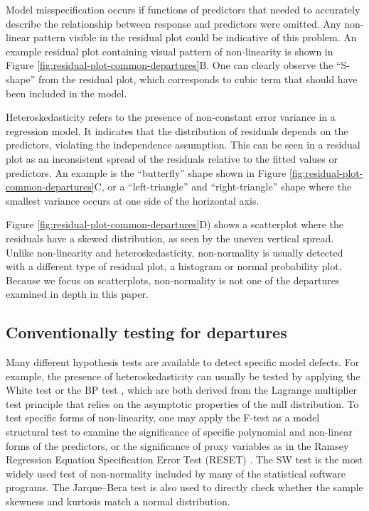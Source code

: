 \documentclass[]{interact}
\theoremstyle{plain}%
\theoremstyle{definition}
\theoremstyle{remark}
\begin{document}
Model misspecification occurs if functions of predictors that needed to
accurately describe the relationship between response and predictors
were omitted. Any non-linear pattern visible in the residual plot could
be indicative of this problem. An example residual plot containing
visual pattern of non-linearity is shown in Figure
\ref{fig:residual-plot-common-departures}B. One can clearly observe the
``S-shape'' from the residual plot, which corresponds to cubic term that
should have been included in the model.

Heteroskedasticity refers to the presence of non-constant error variance
in a regression model. It indicates that the distribution of residuals
depends on the predictors, violating the independence assumption. This
can be seen in a residual plot as an inconsistent spread of the
residuals relative to the fitted values or predictors. An example is the
``butterfly'' shape shown in Figure
\ref{fig:residual-plot-common-departures}C, or a ``left-triangle'' and
``right-triangle'' shape where the smallest variance occurs at one side
of the horizontal axis.

Figure \ref{fig:residual-plot-common-departures}D) shows a scatterplot
where the residuals have a skewed distribution, as seen by the uneven
vertical spread. Unlike non-linearity and heteroskedasticity,
non-normality is usually detected with a different type of residual
plot, a histogram or normal probability plot. Because we focus on
scatterplots, non-normality is not one of the departures examined in
depth in this paper.

\hypertarget{conventionally-testing-for-departures}{%
\subsection{Conventionally testing for
departures}\label{conventionally-testing-for-departures}}

Many different hypothesis tests are available to detect specific model
defects. For example, the presence of heteroskedasticity can usually be
tested by applying the White test
\citep{white_heteroskedasticity-consistent_1980} or the BP test
\citep{breusch_simple_1979}, which are both derived from the Lagrange
multiplier test \citep{silvey1959lagrangian} principle that relies on
the asymptotic properties of the null distribution. To test specific
forms of non-linearity, one may apply the F-test as a model structural
test to examine the significance of specific polynomial and non-linear
forms of the predictors, or the significance of proxy variables as in
the Ramsey Regression Equation Specification Error Test (RESET)
\citep{ramsey_tests_1969}. The SW test \citep{shapiro1965analysis} is
the most widely used test of non-normality included by many of the
statistical software programs. The Jarque--Bera test
\citep{jarque1980efficient} is also used to directly check whether the
sample skewness and kurtosis match a normal distribution.
\end{document}
